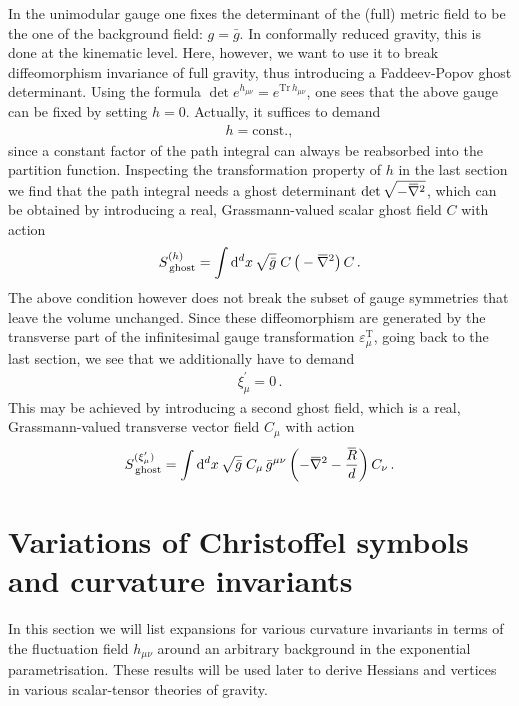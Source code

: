 \documentclass[11pt]{book}
\newcommand{\overbar}[1]{\mkern 1.5mu\overline{\mkern-1.5mu#1\mkern-1.5mu}\mkern 1.5mu}
\newcommand{\bnabla}{\overbar \nabla}
\newcommand{\bR}{\overbar R}
\newcommand{\Tr}{\mathrm{Tr}}
\numberwithin{equation}{chapter}
\begin{document}
\begin{appendices}
In the unimodular gauge one fixes the determinant of the (full) metric field
to be the one of the background field: $g = \bar g$. In conformally reduced
gravity, this is done at the kinematic level. Here, however, we
want to use it to break diffeomorphism invariance of full gravity, thus
introducing a Faddeev-Popov ghost determinant.
Using the formula $\det e^{h_{\mu\nu}} = e^{\Tr \, h_{\mu\nu}}$,
one sees that the above gauge can be fixed by setting $h=0$.
Actually, it suffices to demand
\begin{align}
  h = \mathrm{const.,}
\end{align}
since a constant factor of the path integral can always be reabsorbed into
the partition function. Inspecting the transformation property of $h$
in the last section we find that the path integral needs a ghost
determinant $\det{ \sqrt{-\bnabla^2}}$, which can be obtained by
introducing a real, Grassmann-valued scalar ghost field $C$ with action
\begin{align}
  S_{\,\mathrm{ghost}}^{(h)} = \int \mathrm d^dx \, \sqrt{\bar g} \;
  C \, \big( -\bnabla^2 \big) \, C \,.
\end{align}
The above condition however does not break the subset of gauge symmetries that
leave the volume unchanged. Since these diffeomorphism are generated by the
transverse part of the infinitesimal gauge transformation
$\varepsilon^{\scriptscriptstyle \mathrm T}_\mu$,
going back to the last section, we see that we additionally have to
demand
\begin{align}
  \xi^\prime_\mu = 0 \,.
\end{align}
This may be achieved by introducing a second ghost field, which is a real,
Grassmann-valued transverse vector field $C_\mu$ with action
\begin{align}
  S_{\,\mathrm{ghost}}^{(\xi^\prime_\mu)} = \int \mathrm d^dx \, \sqrt{\bar g} \;  C_\mu \, \bar g^{\mu\nu}
  \left(-\bnabla^2-\frac{\bR}{d}\right) C_\nu \,.
\end{align}


\section{Variations of Christoffel symbols and curvature invariants}

In this section we will list expansions for various curvature
invariants in terms of the fluctuation field $h_{\mu\nu}$ around
an arbitrary background in the exponential parametrisation.
These results will be used later to derive Hessians and
vertices in various scalar-tensor theories of gravity.


\end{appendices}
\end{document}
